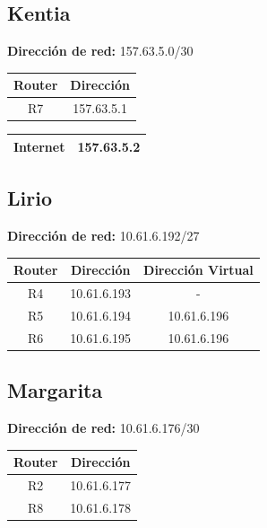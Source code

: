 \subsection{Kentia}
\textbf{Dirección de red:} 157.63.5.0/30	
\begin{table}[!htbp]
\centering
  \begin{tabular}{|c|c|}
    \hline
	Router & Dirección\\ \hline
	R7 & 157.63.5.1\\ 
    \hline
  \end{tabular}
\end{table}

\begin{table}[!htbp]
\centering
  \begin{tabular}{|c|c|}
    \hline
	Internet& 157.63.5.2 \\
    \hline
  \end{tabular}
\end{table}

\subsection{Lirio}

\textbf{Dirección de red:} 10.61.6.192/27

\begin{table}[!htbp]
\centering
  \begin{tabular}{|c|c|c|}
    \hline
	Router & Dirección & Dirección Virtual\\ \hline
	R4 & 10.61.6.193 &  - \\ \hline
	R5 & 10.61.6.194 & 10.61.6.196  \\ \hline
	R6 & 10.61.6.195 & 10.61.6.196 \\
    \hline
  \end{tabular}
\end{table}

\subsection{Margarita}
\textbf{Dirección de red:} 10.61.6.176/30
\begin{table}[!htbp]
\centering
  \begin{tabular}{|c|c|}
    \hline
	Router & Dirección\\ \hline
	R2 & 10.61.6.177\\ \hline
	R8 & 10.61.6.178\\
    \hline
  \end{tabular}
\end{table}

